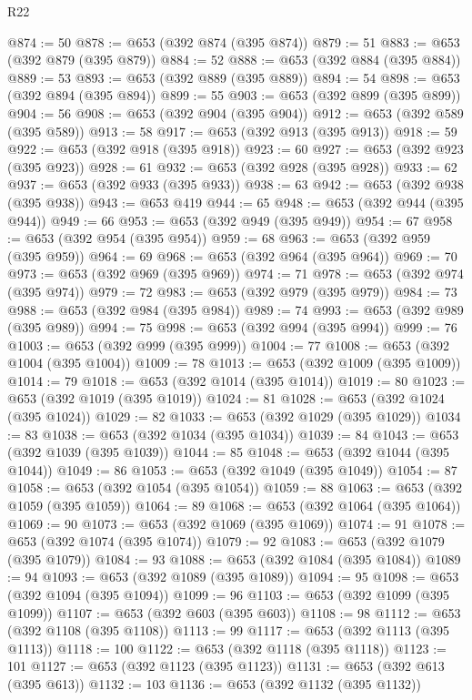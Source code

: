 \begin{lexlean}{R22}
\begin{coremodule}
@874 := 50
@878 := @653 (@392 @874 (@395 @874))
@879 := 51
@883 := @653 (@392 @879 (@395 @879))
@884 := 52
@888 := @653 (@392 @884 (@395 @884))
@889 := 53
@893 := @653 (@392 @889 (@395 @889))
@894 := 54
@898 := @653 (@392 @894 (@395 @894))
@899 := 55
@903 := @653 (@392 @899 (@395 @899))
@904 := 56
@908 := @653 (@392 @904 (@395 @904))
@912 := @653 (@392 @589 (@395 @589))
@913 := 58
@917 := @653 (@392 @913 (@395 @913))
@918 := 59
@922 := @653 (@392 @918 (@395 @918))
@923 := 60
@927 := @653 (@392 @923 (@395 @923))
@928 := 61
@932 := @653 (@392 @928 (@395 @928))
@933 := 62
@937 := @653 (@392 @933 (@395 @933))
@938 := 63
@942 := @653 (@392 @938 (@395 @938))
@943 := @653 @419
@944 := 65
@948 := @653 (@392 @944 (@395 @944))
@949 := 66
@953 := @653 (@392 @949 (@395 @949))
@954 := 67
@958 := @653 (@392 @954 (@395 @954))
@959 := 68
@963 := @653 (@392 @959 (@395 @959))
@964 := 69
@968 := @653 (@392 @964 (@395 @964))
@969 := 70
@973 := @653 (@392 @969 (@395 @969))
@974 := 71
@978 := @653 (@392 @974 (@395 @974))
@979 := 72
@983 := @653 (@392 @979 (@395 @979))
@984 := 73
@988 := @653 (@392 @984 (@395 @984))
@989 := 74
@993 := @653 (@392 @989 (@395 @989))
@994 := 75
@998 := @653 (@392 @994 (@395 @994))
@999 := 76
@1003 := @653 (@392 @999 (@395 @999))
@1004 := 77
@1008 := @653 (@392 @1004 (@395 @1004))
@1009 := 78
@1013 := @653 (@392 @1009 (@395 @1009))
@1014 := 79
@1018 := @653 (@392 @1014 (@395 @1014))
@1019 := 80
@1023 := @653 (@392 @1019 (@395 @1019))
@1024 := 81
@1028 := @653 (@392 @1024 (@395 @1024))
@1029 := 82
@1033 := @653 (@392 @1029 (@395 @1029))
@1034 := 83
@1038 := @653 (@392 @1034 (@395 @1034))
@1039 := 84
@1043 := @653 (@392 @1039 (@395 @1039))
@1044 := 85
@1048 := @653 (@392 @1044 (@395 @1044))
@1049 := 86
@1053 := @653 (@392 @1049 (@395 @1049))
@1054 := 87
@1058 := @653 (@392 @1054 (@395 @1054))
@1059 := 88
@1063 := @653 (@392 @1059 (@395 @1059))
@1064 := 89
@1068 := @653 (@392 @1064 (@395 @1064))
@1069 := 90
@1073 := @653 (@392 @1069 (@395 @1069))
@1074 := 91
@1078 := @653 (@392 @1074 (@395 @1074))
@1079 := 92
@1083 := @653 (@392 @1079 (@395 @1079))
@1084 := 93
@1088 := @653 (@392 @1084 (@395 @1084))
@1089 := 94
@1093 := @653 (@392 @1089 (@395 @1089))
@1094 := 95
@1098 := @653 (@392 @1094 (@395 @1094))
@1099 := 96
@1103 := @653 (@392 @1099 (@395 @1099))
@1107 := @653 (@392 @603 (@395 @603))
@1108 := 98
@1112 := @653 (@392 @1108 (@395 @1108))
@1113 := 99
@1117 := @653 (@392 @1113 (@395 @1113))
@1118 := 100
@1122 := @653 (@392 @1118 (@395 @1118))
@1123 := 101
@1127 := @653 (@392 @1123 (@395 @1123))
@1131 := @653 (@392 @613 (@395 @613))
@1132 := 103
@1136 := @653 (@392 @1132 (@395 @1132))

\end{coremodule}
\end{lexlean}

